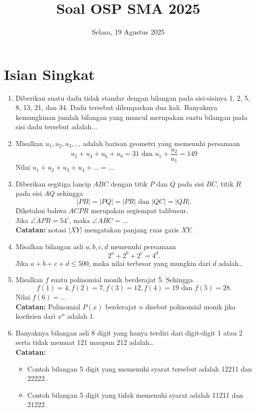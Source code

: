 \documentclass[12pt]{scrartcl}
\title{Soal OSP SMA 2025}
\date{Selasa, 19 Agustus 2025}
\begin{document}
\maketitle

\section{Isian Singkat}

\begin{enumerate}
    \item Diberikan suatu dadu tidak standar dengan bilangan pada sisi-sisinya 1, 2, 5, 8, 13, 21, dan 34. Dadu tersebut dilemparkan dua kali. Banyaknya kemungkinan jumlah bilangan yang muncul merupakan suatu bilangan pada sisi dadu tersebut adalah...

    \item Misalkan $u_1, u_2, u_3, \dots$ adalah barisan geometri yang memenuhi persamaan 
    $$u_2 + u_4 + u_6 + u_8 = 31 \text{ dan } u_1+\dfrac{u_2}{u_1} = 149$$
    Nilai $u_1 + u_2 + u_3 + u_4 + \dots = \dots$

    \item Diberikan segitiga lancip $ABC$ dengan titik $P$ dan $Q$ pada sisi $BC$, titik $R$ pada sisi $AQ$ sehingga $$|PB|=|PQ|=|PR| \text{ dan } |QC|=|QR|.$$
    Diketahui bahwa $ACPR$ merupakan segiempat talibusur.\\
    Jika $\angle APR=54^\circ$, maka $\angle ABC = \dots$ \\
    \textbf{Catatan:} notasi $|XY|$ mengatakan panjang ruas garis $XY$.

    \item Misalkan bilangan asli $a, b, c, d$ memenuhi persamaan $$2^a+2^b+2^c=4^d.$$
    Jika $a+b+c+d \le 500$, maka nilai terbesar yang mungkin dari $d$ adalah\dots

    \item Misalkan $f$ suatu polinomial monik berderajat 5. Sehingga 
    $$f(1)=4, f(2)=7, f(3)=12, f(4)=19 \text{ dan }f(5)=28.$$
    Nilai $f(6)=\dots$ \\
    \textbf{Catatan:} Polinomial $P(x)$ berderajat $n$ disebut polinomial monik jika koefisien dari $x^n$ adalah 1.

    \item Banyaknya bilangan asli 8 digit yang hanya terdiri dari digit-digit 1 atau 2 serta tidak memuat 121 maupun 212 adalah\dots \\
    \textbf{Catatan:}
    \begin{itemize}
        \item Contoh bilangan 5 digit yang memenuhi syarat tersebut adalah 12211 dan 22222.
        \item Contoh bilangan 5 digit yang tidak memenuhi syarat adalah 11211 dan 21222.
    \end{itemize}


\end{enumerate}
\end{document}
